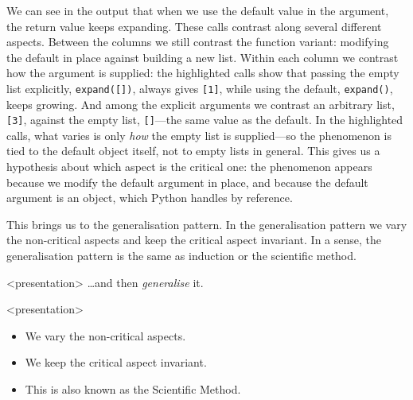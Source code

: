 \begin{description}
    We can see in the output that when we use the default value in the
    argument, the return value keeps expanding.
    These calls contrast along several different aspects.
    Between the columns we still contrast the function variant: modifying
    the default in place against building a new list.
    Within each column we contrast how the argument is supplied: the
    highlighted calls show that passing the empty list explicitly,
    \texttt{expand([])}, always gives \texttt{[1]},
    while using the default, \texttt{expand()}, keeps growing.
    And among the explicit arguments we contrast an arbitrary list,
    \texttt{[3]}, against the empty list,
    \texttt{[]}---the same value as the default.
    In the highlighted calls, what varies is only \emph{how} the empty list
    is supplied---so the phenomenon is tied to the default object itself,
    not to empty lists in general.
    This gives us a hypothesis about which aspect is the critical one: the
    phenomenon appears because we modify the default argument in place, and
    because the default argument is an object, which Python handles by
    reference.

  \item[Generalisation] This brings us to the generalisation pattern.
    In the generalisation pattern we vary the non-critical aspects and keep the
    critical aspect invariant.
    In a sense, the generalisation pattern is the same as induction or the
    scientific method.

    \begin{frame}<presentation>
      \dots and then \emph{generalise} it.
    \end{frame}

    \begin{frame}<presentation>
      \begin{remark}[Generalisation]
        \begin{itemize}
          \item We vary the non-critical aspects.
          \item We keep the critical aspect invariant.
            \pause
          \item \alert<3>{This is also known as the Scientific Method.}
        \end{itemize}
      \end{remark}
    \end{frame}


\end{description}
